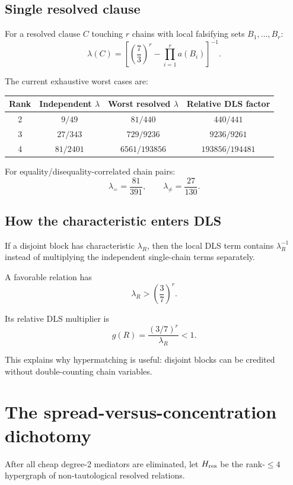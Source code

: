 \documentclass[11pt]{article}
\theoremstyle{plain}
\theoremstyle{definition}
\theoremstyle{remark}
\begin{document}
\subsection{Single resolved clause}

For a resolved clause $C$ touching $r$ chains with local falsifying sets
$B_1,\dots,B_r$:
\[
\boxed{
\lambda(C)=
\left[
\left(\frac73\right)^r
-
\prod_{i=1}^{r}a(B_i)
\right]^{-1}.
}
\]

The current exhaustive worst cases are:

\begin{center}
\begin{tabular}{cccc}
\toprule
Rank & Independent $\lambda$ & Worst resolved $\lambda$ & Relative DLS factor\\
\midrule
2 & $9/49$ & $81/440$ & $440/441$\\
3 & $27/343$ & $729/9236$ & $9236/9261$\\
4 & $81/2401$ & $6561/193856$ & $193856/194481$\\
\bottomrule
\end{tabular}
\end{center}

For equality/disequality-correlated chain pairs:
\[
\lambda_{=} = \frac{81}{391},
\qquad
\lambda_{\ne}=\frac{27}{130}.
\]

\subsection{How the characteristic enters DLS}

If a disjoint block has characteristic $\lambda_R$, then the local DLS term
contains $\lambda_R^{-1}$ instead of multiplying the independent single-chain
terms separately.

A favorable relation has
\[
\lambda_R >
\left(\frac37\right)^r.
\]

Its relative DLS multiplier is
\[
g(R)=
\frac{(3/7)^r}{\lambda_R}<1.
\]

This explains why hypermatching is useful: disjoint blocks can be credited
without double-counting chain variables.

\section{The spread-versus-concentration dichotomy}

After all cheap degree-2 mediators are eliminated, let $H_{\rm res}$ be the
rank-$\le4$ hypergraph of non-tautological resolved relations.
\end{document}
